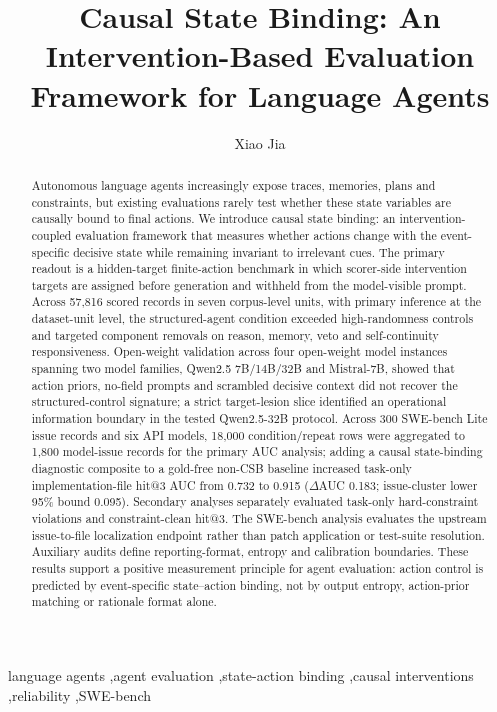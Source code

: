 ﻿\documentclass[preprint,12pt,authoryear]{elsarticle}
\begin{document}
\begin{frontmatter}

\title{Causal State Binding: An Intervention-Based Evaluation Framework for Language Agents}

\author[aff1]{Xiao Jia}
\address[aff1]{School of Artificial Intelligence, The Chinese University of Hong Kong, Shenzhen, 2001 Longxiang Avenue, Longgang District, Shenzhen, Guangdong 518172, China}
\begin{abstract}
Autonomous language agents increasingly expose traces, memories, plans and constraints, but existing evaluations rarely test whether these state variables are causally bound to final actions. We introduce causal state binding: an intervention-coupled evaluation framework that measures whether actions change with the event-specific decisive state while remaining invariant to irrelevant cues. The primary readout is a hidden-target finite-action benchmark in which scorer-side intervention targets are assigned before generation and withheld from the model-visible prompt. Across 57,816 scored records in seven corpus-level units, with primary inference at the dataset-unit level, the structured-agent condition exceeded high-randomness controls and targeted component removals on reason, memory, veto and self-continuity responsiveness. Open-weight validation across four open-weight model instances spanning two model families, Qwen2.5 7B/14B/32B and Mistral-7B, showed that action priors, no-field prompts and scrambled decisive context did not recover the structured-control signature; a strict target-lesion slice identified an operational information boundary in the tested Qwen2.5-32B protocol. Across 300 SWE-bench Lite issue records and six API models, 18,000 condition/repeat rows were aggregated to 1,800 model-issue records for the primary AUC analysis; adding a causal state-binding diagnostic composite to a gold-free non-CSB baseline increased task-only implementation-file hit@3 AUC from 0.732 to 0.915 (\(\Delta\)AUC 0.183; issue-cluster lower 95\% bound 0.095). Secondary analyses separately evaluated task-only hard-constraint violations and constraint-clean hit@3. The SWE-bench analysis evaluates the upstream issue-to-file localization endpoint rather than patch application or test-suite resolution. Auxiliary audits define reporting-format, entropy and calibration boundaries. These results support a positive measurement principle for agent evaluation: action control is predicted by event-specific state--action binding, not by output entropy, action-prior matching or rationale format alone.
\end{abstract}

\begin{keyword}
language agents \sep agent evaluation \sep state-action binding \sep causal interventions \sep reliability \sep SWE-bench
\end{keyword}

\end{frontmatter}
\sloppy
\end{document}

